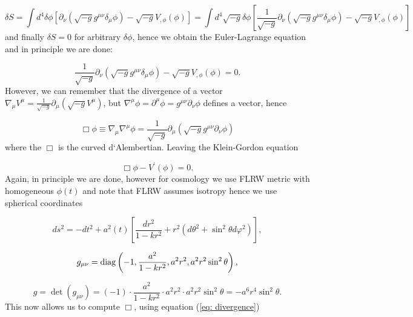 \begin{equation*}
    \delta S = \int d^4 \delta \phi [\partial_{\nu} (\sqrt{-g} g^{\mu \nu} \delta_{\mu} \phi) - \sqrt{-g} V_{, \phi}(\phi)] = \int d^4 \sqrt{-g} \delta \phi \left[ \frac{1}{\sqrt{-g}} \partial_{\nu} (\sqrt{-g} g^{\mu \nu} \delta_{\mu} \phi) - \sqrt{-g} V_{, \phi}(\phi) \right]
\end{equation*}
and finally $\delta S = 0$ for arbitrary $\delta \phi$, hence we obtain the Euler-Lagrange equation and in principle we are done:

\begin{equation*}
    \frac{1}{\sqrt{-g}} \partial_{\nu} (\sqrt{-g} g^{\mu \nu} \delta_{\mu} \phi) - \sqrt{-g} V_{, \phi}(\phi) = 0.
\end{equation*}
However, we can remember that the divergence of a vector $\nabla_{\mu} V^{\mu} = \frac{1}{\sqrt{-g}} \partial_{\mu} (\sqrt{-g} V^{\mu})$, but $\nabla^{\mu} \phi = \partial^{\mu} \phi = g^{\mu \nu} \partial_{\nu} \phi$ defines a vector, hence

\begin{equation}\label{eq: divergence}
    \Box \phi \equiv \nabla_{\mu} \nabla^{\mu} \phi = \frac{1}{\sqrt{-g}} \partial_{\mu} (\sqrt{-g} g^{\mu \nu} \partial_{\nu} \phi)
\end{equation}
where the $\Box$ is the curved d`Alembertian. Leaving the Klein-Gordon equation

\begin{equation*}
    \Box \phi - V^{\prime}(\phi) = 0.
\end{equation*}
Again, in principle we are done, however for cosmology we use FLRW metric with homogeneous $\phi(t)$ and note that FLRW assumes isotropy hence we use spherical coordinates

\begin{equation*}
    ds^2 = -dt^2 + a^2(t) \left[ \frac{dr^2}{1-kr^2} + r^2(d \theta^2 + \sin^2 \theta d \varphi^2) \right],
\end{equation*}

\begin{equation*}
    g_{\mu \nu} = {\rm diag} \left( -1, \frac{a^2}{1-kr^2}, a^2 r^2, a^2 r^2 \sin^2 \theta \right),
\end{equation*}

\begin{equation*}
    g = \det(g_{\mu \nu}) = (-1) \cdot \frac{a^2}{1-kr^2} \cdot a^2 r^2 \cdot a^2 r^2 \sin^2 \theta = -a^6 r^4 \sin^2 \theta.
\end{equation*}
This now allows us to compute $\Box$, using equation (\ref{eq: divergence})

